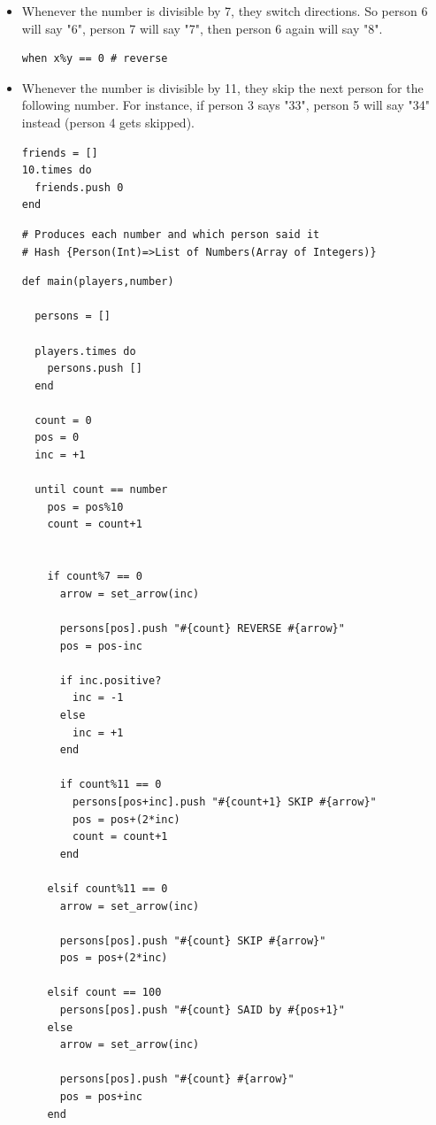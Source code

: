 \documentclass[11pt]{article}
\begin{document}
\begin{itemize}
\item Whenever the number is divisible by 7, they switch directions. So person 6 
will say "6", person 7 will say "7", then person 6 again will say "8".

\begin{verbatim}
when x%y == 0 # reverse
\end{verbatim}

\item Whenever the number is divisible by 11, they skip the next person for the 
following number. For instance, if person 3 says "33", person 5 will say 
"34" instead (person 4 gets skipped).

\begin{verbatim}
friends = []
10.times do 
  friends.push 0
end
\end{verbatim}

\begin{verbatim}
# Produces each number and which person said it
# Hash {Person(Int)=>List of Numbers(Array of Integers)}
\end{verbatim}

\begin{verbatim}
def main(players,number)

  persons = []

  players.times do
    persons.push []
  end

  count = 0
  pos = 0
  inc = +1

  until count == number
    pos = pos%10
    count = count+1


    if count%7 == 0
      arrow = set_arrow(inc)

      persons[pos].push "#{count} REVERSE #{arrow}"
      pos = pos-inc

      if inc.positive?
        inc = -1
      else
        inc = +1
      end

      if count%11 == 0
        persons[pos+inc].push "#{count+1} SKIP #{arrow}"
        pos = pos+(2*inc)
        count = count+1
      end

    elsif count%11 == 0
      arrow = set_arrow(inc)

      persons[pos].push "#{count} SKIP #{arrow}"
      pos = pos+(2*inc)

    elsif count == 100
      persons[pos].push "#{count} SAID by #{pos+1}"
    else
      arrow = set_arrow(inc)

      persons[pos].push "#{count} #{arrow}"
      pos = pos+inc
    end


\end{verbatim}
\end{itemize}
\end{document}
